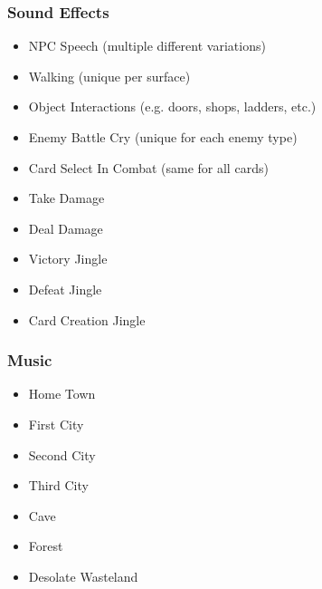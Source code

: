 \documentclass[12pt,titlepage]{article}
\newcounter{subsubsubsection}[subsubsection]
\begin{document}
%
%
%
%
%

\subsubsection{Sound Effects}

\begin{itemize}
    \item NPC Speech (multiple different variations)
    \item Walking (unique per surface)
    \item Object Interactions (e.g. doors, shops, ladders, etc.)
\end{itemize}

\begin{itemize}
    \item Enemy Battle Cry (unique for each enemy type)
    \item Card Select In Combat (same for all cards)
    \item Take Damage
    \item Deal Damage
    \item Victory Jingle
    \item Defeat Jingle
\end{itemize}

\begin{itemize}
    \item Card Creation Jingle
\end{itemize}

\subsubsection{Music}

\begin{itemize}
    \item Home Town
    \item First City
    \item Second City
    \item Third City
    \item Cave
    \item Forest
    \item Desolate Wasteland
\end{itemize}
\end{document}
